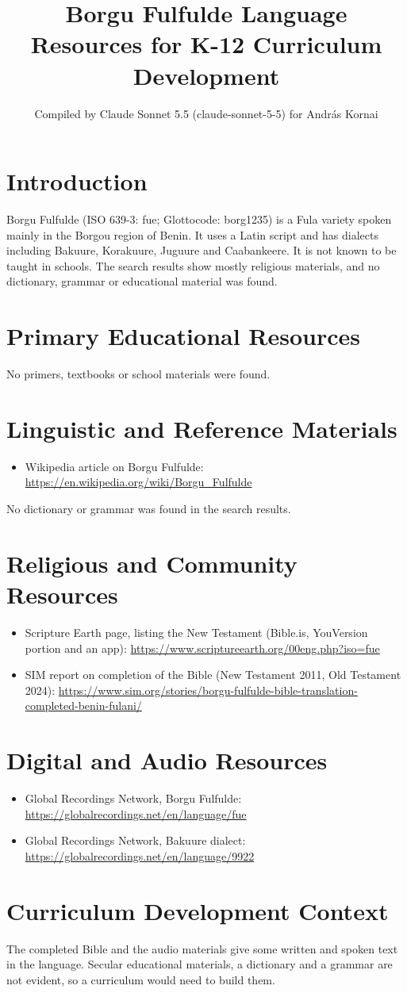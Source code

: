 \documentclass[12pt]{article}
\title{Borgu Fulfulde Language Resources for K-12 Curriculum Development}
\author{Compiled by Claude Sonnet 5.5 (claude-sonnet-5-5) for Andr\'as Kornai}
\date{}
\begin{document}
\maketitle

\section{Introduction}
Borgu Fulfulde (ISO 639-3: fue; Glottocode: borg1235) is a Fula variety spoken mainly in the Borgou region of Benin. It uses a Latin script and has dialects including Bakuure, Korakuure, Juguure and Caabankeere. It is not known to be taught in schools. The search results show mostly religious materials, and no dictionary, grammar or educational material was found.

\section{Primary Educational Resources}
No primers, textbooks or school materials were found.

\section{Linguistic and Reference Materials}
\begin{itemize}
\item Wikipedia article on Borgu Fulfulde: \url{https://en.wikipedia.org/wiki/Borgu_Fulfulde}
\end{itemize}
No dictionary or grammar was found in the search results.

\section{Religious and Community Resources}
\begin{itemize}
\item Scripture Earth page, listing the New Testament (Bible.is, YouVersion portion and an app): \url{https://www.scriptureearth.org/00eng.php?iso=fue}
\item SIM report on completion of the Bible (New Testament 2011, Old Testament 2024): \url{https://www.sim.org/stories/borgu-fulfulde-bible-translation-completed-benin-fulani/}
\end{itemize}

\section{Digital and Audio Resources}
\begin{itemize}
\item Global Recordings Network, Borgu Fulfulde: \url{https://globalrecordings.net/en/language/fue}
\item Global Recordings Network, Bakuure dialect: \url{https://globalrecordings.net/en/language/9922}
\end{itemize}

\section{Curriculum Development Context}
The completed Bible and the audio materials give some written and spoken text in the language. Secular educational materials, a dictionary and a grammar are not evident, so a curriculum would need to build them.
\end{document}

